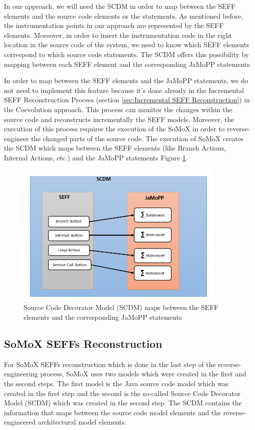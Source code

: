 In our approach, we will need the SCDM in order to map between the SEFF elements and the source code elements or the statements. As mentioned before, the instrumentation points in our approach are represented by the SEFF elements. Moreover, in order to insert the instrumentation code in the right location in the source code of the system, we need to know which SEFF elements correspond to which source code statements. The SCDM offers this possibility by mapping between each SEFF element and the corresponding JaMoPP statements. 

In order to map between the SEFF elements and the JaMoPP statements, we do not need to implement this feature because it's done already in the Incremental SEFF Reconstruction Process (section \ref{sec:Incremental SEFF Reconstruction}) in the Coevolution approach. This process can monitor the changes within the source code and reconstructs incrementally the SEFF models. Moreover, the execution of this process requires the execution of the SoMoX in order to reverse-engineer the changed parts of the source code. The execution of SoMoX creates the SCDM which maps between the SEFF elements (like Branch Actions, Internal Actions, etc.) and the JaMoPP statements Figure \ref{fig:seff jamopp}.


\begin{figure}[h]
\centering
\includegraphics[width=0.9\textwidth]{figures/seff_jamopp}
\caption{Source Code Decorator Model (SCDM) maps between the SEFF elements and the corresponding JaMoPP statements}
\label{fig:seff jamopp}
\end{figure}

\subsection{SoMoX SEFFs Reconstruction}  
\label{sec:SoMoX SEFFs Reconstruction}
For SoMoX SEFFs reconstruction which is done in the last step of the reverse-engineering process, SoMoX uses two models which were created in the first and the second steps. The first model is the Java source code model which was created in the first step and the second is the so-called Source Code Decorator Model (SCDM) which was created in the second step. The SCDM contains the information that maps between the source code model elements and the reverse-engineered architectural model elements.

